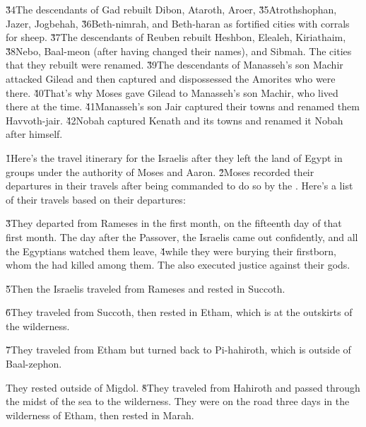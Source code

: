 \v{34}The descendants of Gad rebuilt Dibon, Ataroth, Aroer, \v{35}Atrothshophan, Jazer, Jogbehah, \v{36}Beth-nimrah, and Beth-haran as fortified cities with corrals for sheep. \v{37}The descendants of Reuben rebuilt Heshbon, Elealeh, Kiriathaim, \v{38}Nebo, Baal-meon (after having changed their names), and Sibmah. The cities that they rebuilt were renamed. \v{39}The descendants of Manasseh's son Machir attacked Gilead and then captured and dispossessed the Amorites who were there. \v{40}That's why Moses gave Gilead to Manasseh's son Machir, who lived there at the time. \v{41}Manasseh's son Jair captured their towns and renamed them Havvoth-jair. \v{42}Nobah captured Kenath and its towns and renamed it Nobah after himself.

\v{1}Here's the travel itinerary for the Israelis after they left the land of Egypt in groups under the authority of Moses and Aaron. \v{2}Moses recorded their departures in their travels after being commanded to do so by the . Here's a list of their travels based on their departures:

\v{3}They departed from Rameses in the first month, on the fifteenth day of that first month. The day after the Passover, the Israelis came out confidently, and all the Egyptians watched them leave, \v{4}while they were burying their firstborn, whom the  had killed among them. The  also executed justice against their gods.

\v{5}Then the Israelis traveled from Rameses and rested in Succoth.

\v{6}They traveled from Succoth, then rested in Etham, which is at the outskirts of the wilderness.

\v{7}They traveled from Etham but turned back to Pi-hahiroth, which is outside of Baal-zephon.

They rested outside of Migdol. \v{8}They traveled from Hahiroth and passed through the midst of the sea to the wilderness. They were on the road three days in the wilderness of Etham, then rested in Marah.


